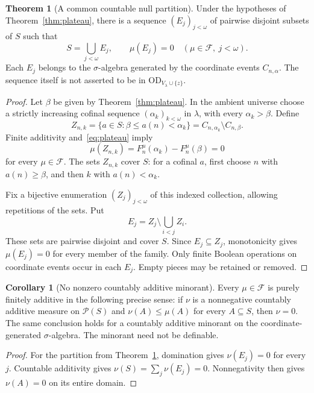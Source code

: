 \documentclass[11pt,letterpaper]{article}
\theoremstyle{definition}
\newtheorem{theorem}[definition]{Theorem}
\newtheorem{corollary}[definition]{Corollary}
\newcommand{\OD}{\mathrm{OD}}
\newcommand{\Pow}{\mathcal P}
\newcommand{\ODz}{\OD_{V_\lambda\cup\{z\}}}
\begin{document}
\begin{theorem}[A common countable null partition]\label{thm:null}
Under the hypotheses of Theorem~\ref{thm:plateau}, there is a sequence $(E_j)_{j<\omega}$ of pairwise disjoint subsets of $S$ such that
\begin{equation}\label{eq:nullcover}
 S=\bigcup_{j<\omega}E_j,
 \qquad \mu(E_j)=0
 \quad(\mu\in\mathcal F,\ j<\omega).
\end{equation}
Each $E_j$ belongs to the $\sigma$-algebra generated by the coordinate events $C_{n,\alpha}$. The sequence itself is not asserted to be in $\ODz$.
\end{theorem}

\begin{proof}
Let $\beta$ be given by Theorem~\ref{thm:plateau}. In the ambient universe choose a strictly increasing cofinal sequence $(\alpha_k)_{k<\omega}$ in $\lambda$, with every $\alpha_k>\beta$. Define
\[
 Z_{n,k}=\{a\in S:\beta\le a(n)<\alpha_k\}
       =C_{n,\alpha_k}\setminus C_{n,\beta}.
\]
Finite additivity and~\eqref{eq:plateau} imply
\[
 \mu(Z_{n,k})=F_n^\mu(\alpha_k)-F_n^\mu(\beta)=0
\]
for every $\mu\in\mathcal F$. The sets $Z_{n,k}$ cover $S$: for a cofinal $a$, first choose $n$ with $a(n)\ge\beta$, and then $k$ with $a(n)<\alpha_k$.

Fix a bijective enumeration $(Z_j)_{j<\omega}$ of this indexed collection, allowing repetitions of the sets. Put
\[
 E_j=Z_j\setminus\bigcup_{i<j}Z_i.
\]
These sets are pairwise disjoint and cover $S$. Since $E_j\subseteq Z_j$, monotonicity gives $\mu(E_j)=0$ for every member of the family. Only finite Boolean operations on coordinate events occur in each $E_j$. Empty pieces may be retained or removed.
\end{proof}

\begin{corollary}[No nonzero countably additive minorant]\label{cor:pure}
Every $\mu\in\mathcal F$ is purely finitely additive in the following precise sense: if $\nu$ is a nonnegative countably additive measure on $\Pow(S)$ and $\nu(A)\le\mu(A)$ for every $A\subseteq S$, then $\nu=0$. The same conclusion holds for a countably additive minorant on the coordinate-generated $\sigma$-algebra. The minorant need not be definable.
\end{corollary}

\begin{proof}
For the partition from Theorem~\ref{thm:null}, domination gives $\nu(E_j)=0$ for every $j$. Countable additivity gives $\nu(S)=\sum_j\nu(E_j)=0$. Nonnegativity then gives $\nu(A)=0$ on its entire domain.
\end{proof}
\end{document}

